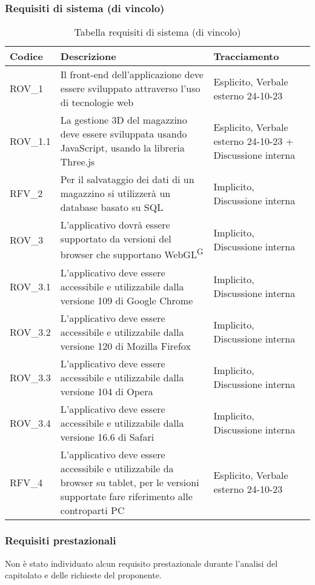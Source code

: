 \subsubsection{Requisiti di sistema (di vincolo)}\label{subsec:requisiti_vincolo}
\begin{xltabular}{\textwidth}{ p{0.1\textwidth} | X | p{0.3\textwidth} }
    \textbf{\color{white} Codice} & \textbf{\color{white} Descrizione} & \textbf{\color{white} Tracciamento} \\ 
    \endhead

    \caption{Tabella requisiti di sistema (di vincolo)}
    \endlastfoot

    ROV\_1 & Il front-end dell'applicazione deve essere sviluppato attraverso l'uso di tecnologie web & Esplicito, Verbale esterno 24-10-23 \\
    ROV\_1.1 & La gestione 3D del magazzino deve essere sviluppata usando JavaScript, usando la libreria Three.js & Esplicito, Verbale esterno 24-10-23 + Discussione interna \\
    RFV\_2 & Per il salvataggio dei dati di un magazzino si utilizzerà un database basato su SQL & Implicito, Discussione interna\\
    ROV\_3 & L'applicativo dovrà essere supportato da versioni del browser che supportano WebGL\textsuperscript{G} & Implicito, Discussione interna\\
    ROV\_3.1 & L'applicativo deve essere accessibile e utilizzabile dalla versione 109 di Google Chrome & Implicito, Discussione interna\\
    ROV\_3.2 & L'applicativo deve essere accessibile e utilizzabile dalla versione 120 di Mozilla Firefox & Implicito, Discussione interna\\
    ROV\_3.3 & L'applicativo deve essere accessibile e utilizzabile dalla versione 104 di Opera & Implicito, Discussione interna\\
    ROV\_3.4 & L'applicativo deve essere accessibile e utilizzabile dalla versione 16.6 di Safari & Implicito, Discussione interna\\
    RFV\_4 & L'applicativo deve essere accessibile e utilizzabile da browser su tablet, per le versioni supportate fare riferimento alle controparti PC & Esplicito, Verbale esterno 24-10-23\\

    \hline
\end{xltabular}

\subsubsection{Requisiti prestazionali}\label{subsec:requisiti_prestazionali}
Non è stato individuato alcun requisito prestazionale durante l’analisi del capitolato e delle richieste del proponente.

